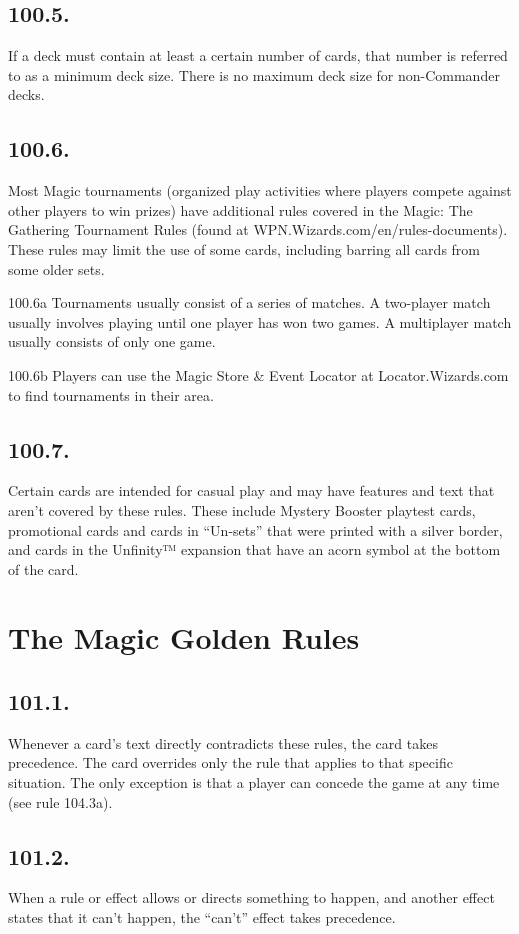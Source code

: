 \subsection*{100.5.}
If a deck must contain at least a certain number of cards, that number is referred to as a minimum deck size. There is no maximum deck size for non-Commander decks.

\subsection*{100.6.}
Most Magic tournaments (organized play activities where players compete against other players to win prizes) have additional rules covered in the Magic: The Gathering Tournament Rules (found at WPN.Wizards.com/en/rules-documents). These rules may limit the use of some cards, including barring all cards from some older sets.

100.6a Tournaments usually consist of a series of matches. A two-player match usually involves playing until one player has won two games. A multiplayer match usually consists of only one game.

100.6b Players can use the Magic Store \& Event Locator at Locator.Wizards.com to find tournaments in their area.

\subsection*{100.7.}
Certain cards are intended for casual play and may have features and text that aren’t covered by these rules. These include Mystery Booster playtest cards, promotional cards and cards in “Un-sets” that were printed with a silver border, and cards in the Unfinity™ expansion that have an acorn symbol at the bottom of the card.

\section{The Magic Golden Rules}
\subsection*{101.1.}
Whenever a card’s text directly contradicts these rules, the card takes precedence. The card overrides only the rule that applies to that specific situation. The only exception is that a player can concede the game at any time (see rule 104.3a).

\subsection*{101.2.}
When a rule or effect allows or directs something to happen, and another effect states that it can’t happen, the “can’t” effect takes precedence.


